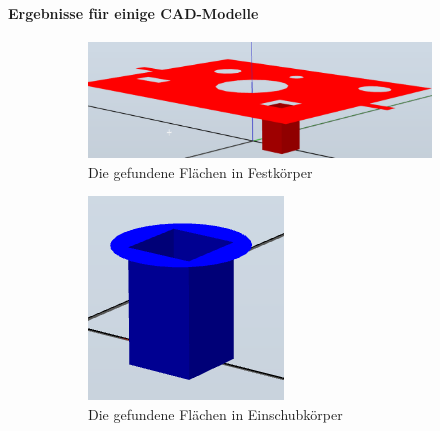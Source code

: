 \documentclass[14pt,a4paper,titlepage]{article}
\begin{document}
		\paragraph{Ergebnisse für einige CAD-Modelle}
			\begin{figure}[b!]
				\centering
				\begin{subfigure}{0.3\linewidth}
					\includegraphics[width=\linewidth]{basefaces1.png}
					\caption{Die gefundene Flächen in Festkörper}
				\end{subfigure}
				\begin{subfigure}{0.3\linewidth}
					\includegraphics[width=\linewidth]{insertfaces1.png}
					\caption{Die gefundene Flächen in Einschubkörper}
				\end{subfigure}	
				\begin{subfigure}{0.3\linewidth}

\end{subfigure}
\end{figure}
\end{document}
